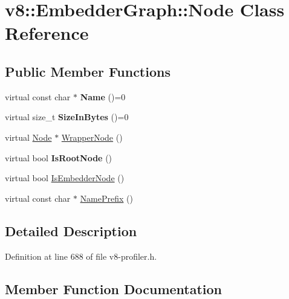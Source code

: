 \hypertarget{classv8_1_1EmbedderGraph_1_1Node}{}\section{v8\+:\+:Embedder\+Graph\+:\+:Node Class Reference}
\label{classv8_1_1EmbedderGraph_1_1Node}
\subsection*{Public Member Functions}
\begin{DoxyCompactItemize}
\item 
\mbox{\label{classv8_1_1EmbedderGraph_1_1Node_af07ffa90f03e52bf53e58ab512c2e1fe}} 
virtual const char $\ast$ {\bfseries Name} ()=0
\item 
\mbox{\label{classv8_1_1EmbedderGraph_1_1Node_a47fa609f09f06eb6f9dac80e46fcbe10}} 
virtual size\+\_\+t {\bfseries Size\+In\+Bytes} ()=0
\item 
virtual \mbox{\hyperlink{classv8_1_1EmbedderGraph_1_1Node}{Node}} $\ast$ \mbox{\hyperlink{classv8_1_1EmbedderGraph_1_1Node_acfe58e3b4db90c2ebbfcee5f81415181}{Wrapper\+Node}} ()
\item 
\mbox{\label{classv8_1_1EmbedderGraph_1_1Node_ad1ebb9298b7fcac73c55e693e028a501}} 
virtual bool {\bfseries Is\+Root\+Node} ()
\item 
virtual bool \mbox{\hyperlink{classv8_1_1EmbedderGraph_1_1Node_a62a22058ec311d7e9b6ac8ec061967af}{Is\+Embedder\+Node}} ()
\item 
virtual const char $\ast$ \mbox{\hyperlink{classv8_1_1EmbedderGraph_1_1Node_a2c4c64b2c3eab48dcdc587aec8734ee8}{Name\+Prefix}} ()
\end{DoxyCompactItemize}


\subsection{Detailed Description}


Definition at line 688 of file v8-\/profiler.\+h.



\subsection{Member Function Documentation}
\mbox{\label{classv8_1_1EmbedderGraph_1_1Node_a62a22058ec311d7e9b6ac8ec061967af}} 
